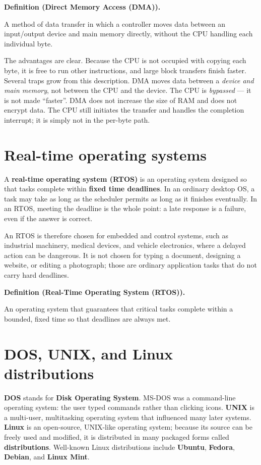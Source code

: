 \documentclass[11pt]{article}
\newenvironment{definitionbox}[1]{%
  \par\noindent\textbf{Definition (#1).}\ \itshape
}{\par\vspace{0.3em}}
\begin{document}
\begin{definitionbox}{Direct Memory Access (DMA)}
A method of data transfer in which a controller moves data between an
input/output device and main memory directly, without the CPU handling each
individual byte.
\end{definitionbox}

The advantages are clear. Because the CPU is not occupied with copying each
byte, it is free to run other instructions, and large block transfers finish
faster. Several traps grow from this description. DMA moves data between a
\emph{device and main memory}, not between the CPU and the device. The CPU is
\emph{bypassed} --- it is not made ``faster''. DMA does not increase the size
of RAM and does not encrypt data. The CPU still initiates the transfer and
handles the completion interrupt; it is simply not in the per-byte path.

\section{Real-time operating systems}
A \textbf{real-time operating system (RTOS)} is an operating system designed
so that tasks complete within \textbf{fixed time deadlines}. In an ordinary
desktop OS, a task may take as long as the scheduler permits as long as it
finishes eventually. In an RTOS, meeting the deadline is the whole point: a
late response is a failure, even if the answer is correct.

An RTOS is therefore chosen for embedded and control systems, such as
industrial machinery, medical devices, and vehicle electronics, where a
delayed action can be dangerous. It is not chosen for typing a document,
designing a website, or editing a photograph; those are ordinary
application tasks that do not carry hard deadlines.

\begin{definitionbox}{Real-Time Operating System (RTOS)}
An operating system that guarantees that critical tasks complete within a
bounded, fixed time so that deadlines are always met.
\end{definitionbox}

\section{DOS, UNIX, and Linux distributions}
\textbf{DOS} stands for \textbf{Disk Operating System}. MS-DOS was a
command-line operating system: the user typed commands rather than clicking
icons. \textbf{UNIX} is a multi-user, multitasking operating system that
influenced many later systems. \textbf{Linux} is an open-source, UNIX-like
operating system; because its source can be freely used and modified, it is
distributed in many packaged forms called \textbf{distributions}. Well-known
Linux distributions include \textbf{Ubuntu}, \textbf{Fedora}, \textbf{Debian},
and \textbf{Linux Mint}.
\end{document}
